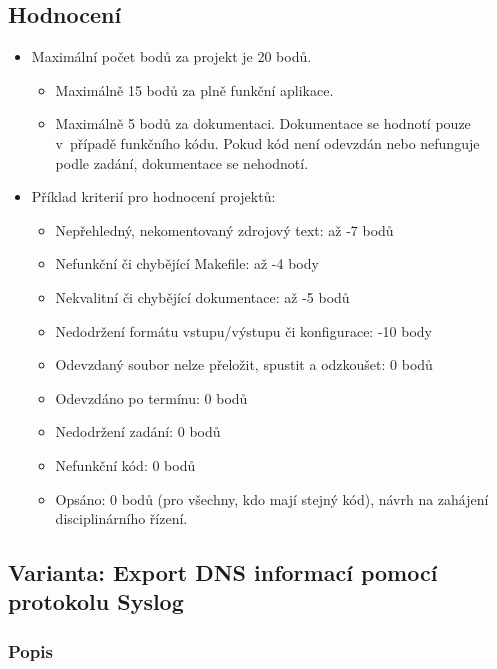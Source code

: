 \documentclass[11pt, a4paper, titlepage]{article}
\begin{document}

\subsection*{Hodnocení}

\begin{itemize}
	\item Maximální počet bodů za projekt je 20 bodů.
	\begin{itemize}
		\item Maximálně 15 bodů za plně funkční aplikace.
		\item Maximálně 5 bodů za dokumentaci. Dokumentace se hodnotí pouze v~případě funkčního kódu. Pokud kód není odevzdán nebo nefunguje podle zadání, dokumentace se nehodnotí.
	\end{itemize}
	\item Příklad kriterií pro hodnocení projektů:
	\begin{itemize}
		\item Nepřehledný, nekomentovaný zdrojový text: až -7 bodů
		\item Nefunkční či chybějící Makefile: až -4 body
		\item Nekvalitní či chybějící dokumentace: až -5 bodů
		\item Nedodržení formátu vstupu/výstupu či konfigurace: -10 body
		\item Odevzdaný soubor nelze přeložit, spustit a odzkoušet: 0 bodů
		\item Odevzdáno po termínu: 0 bodů
		\item Nedodržení zadání: 0 bodů
		\item Nefunkční kód: 0 bodů
		\item Opsáno: 0 bodů (pro všechny, kdo mají stejný kód), návrh na zahájení disciplinárního řízení.
	\end{itemize}
\end{itemize}


\subsection*{Varianta: Export DNS informací pomocí protokolu Syslog}

\subsubsection*{Popis}
\end{document}
